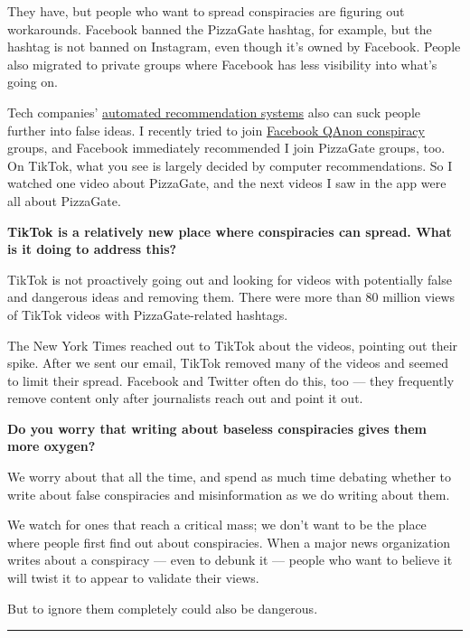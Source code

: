 They have, but people who want to spread conspiracies are figuring out
workarounds. Facebook banned the PizzaGate hashtag, for example, but the
hashtag is not banned on Instagram, even though it's owned by Facebook.
People also migrated to private groups where Facebook has less
visibility into what's going on.

Tech companies'
\href{https://www.nytimes.com/2020/04/20/technology/youtube-conspiracy-theories.html}{automated
recommendation systems} also can suck people further into false ideas. I
recently tried to join
\href{https://www.nytimes.com/2018/08/01/us/politics/what-is-qanon.html}{Facebook
QAnon conspiracy} groups, and Facebook immediately recommended I join
PizzaGate groups, too. On TikTok, what you see is largely decided by
computer recommendations. So I watched one video about PizzaGate, and
the next videos I saw in the app were all about PizzaGate.

\textbf{TikTok is a relatively new place where conspiracies can spread.
What is it doing to address this?}

TikTok is not proactively going out and looking for videos with
potentially false and dangerous ideas and removing them. There were more
than 80 million views of TikTok videos with PizzaGate-related hashtags.

The New York Times reached out to TikTok about the videos, pointing out
their spike. After we sent our email, TikTok removed many of the videos
and seemed to limit their spread. Facebook and Twitter often do this,
too --- they frequently remove content only after journalists reach out
and point it out.

\textbf{Do you worry that writing about baseless conspiracies gives them
more oxygen?}

We worry about that all the time, and spend as much time debating
whether to write about false conspiracies and misinformation as we do
writing about them.

We watch for ones that reach a critical mass; we don't want to be the
place where people first find out about conspiracies. When a major news
organization writes about a conspiracy --- even to debunk it --- people
who want to believe it will twist it to appear to validate their views.

But to ignore them completely could also be dangerous.

\begin{center}\rule{0.5\linewidth}{\linethickness}\end{center}

